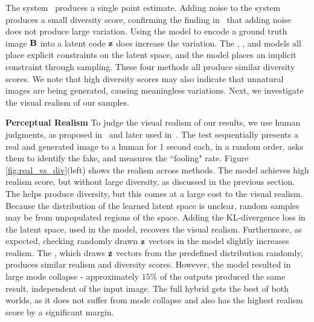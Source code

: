 The \pp system~\citep{isola2016image} produces a single point estimate. Adding noise to the system \ppn produces a small diversity score, confirming the finding in~\citep{isola2016image} that adding noise does not produce large variation. Using the \cae model to encode a ground truth image $\mathbf{B}$ into a latent code $\mathbf{z}$ does increase the variation. The \cvaegan, \cvaeganp, and \bicycle models all place explicit constraints on the latent space, and the \cinfogan model places an implicit constraint through sampling. These four methods all produce similar diversity scores. We note that high diversity scores may also indicate that unnatural images are being generated, causing meaningless variations. Next, we investigate the visual realism of our samples.

{\bf Perceptual Realism} To judge the visual realism of our results, we use human judgments, as proposed in~\citep{zhang2016colorful} and later used in~\citep{isola2016image,zhu2017unpaired}. The test sequentially presents a real and generated image to a human for 1 second each, in a random order, asks them to identify the fake, and measures the ``fooling" rate. %
Figure \ref{fig:real_vs_div}(left) shows the realism across methods. The \ppn model achieves high realism score, but without large diversity, as discussed in the previous section. 
The \cae helps produce diversity, but this comes at a large cost to the visual realism. Because the distribution of the learned latent space is unclear, random samples may be from unpopulated regions of the space. Adding the KL-divergence loss in the latent space, used in the \cvaegan model, recovers the visual realism. Furthermore, as expected, checking randomly drawn $\mathbf{z}$ vectors in the \cvaeganp model slightly increases realism. The \cinfogan, which draws $\mathbf{z}$ vectors from the predefined distribution randomly, produces similar realism and diversity scores. However, the \cinfogan model resulted in large mode collapse - approximately $15\%$ of the outputs produced the same result, independent of the input image. The full hybrid \bicycle gets the best of both worlds, as it does not suffer from mode collapse and also has the highest realism score by a significant margin.  

